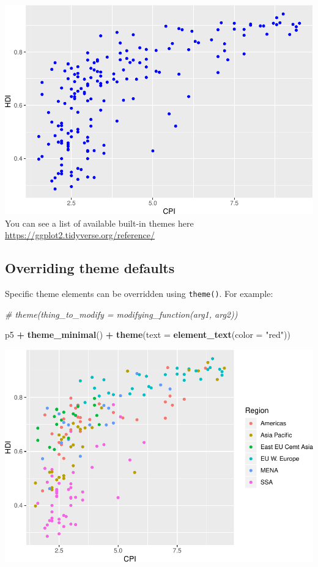 \documentclass[]{book}
\newenvironment{Shaded}{\begin{snugshade}}{\end{snugshade}}
\newcommand{\CommentTok}[1]{\textcolor[rgb]{0.56,0.35,0.01}{\textit{#1}}}
\newcommand{\DataTypeTok}[1]{\textcolor[rgb]{0.13,0.29,0.53}{#1}}
\newcommand{\KeywordTok}[1]{\textcolor[rgb]{0.13,0.29,0.53}{\textbf{#1}}}
\newcommand{\NormalTok}[1]{#1}
\newcommand{\OperatorTok}[1]{\textcolor[rgb]{0.81,0.36,0.00}{\textbf{#1}}}
\newcommand{\StringTok}[1]{\textcolor[rgb]{0.31,0.60,0.02}{#1}}
\begin{document}
\includegraphics{R/Rgraphics/figures/unnamed-chunk-195-1.pdf}
You can see a list of available built-in themes here \url{https://ggplot2.tidyverse.org/reference/}

\hypertarget{overriding-theme-defaults}{%
\subsection{Overriding theme defaults}\label{overriding-theme-defaults}}

Specific theme elements can be overridden using \texttt{theme()}. For example:

\begin{Shaded}
\begin{Highlighting}[]
\CommentTok{# theme(thing_to_modify = modifying_function(arg1, arg2))}

\NormalTok{p5 }\OperatorTok{+}\StringTok{ }\KeywordTok{theme_minimal}\NormalTok{() }\OperatorTok{+}
\StringTok{  }\KeywordTok{theme}\NormalTok{(}\DataTypeTok{text =} \KeywordTok{element_text}\NormalTok{(}\DataTypeTok{color =} \StringTok{"red"}\NormalTok{))  }
\end{Highlighting}
\end{Shaded}

\includegraphics{R/Rgraphics/figures/unnamed-chunk-196-1.pdf}
\end{document}
